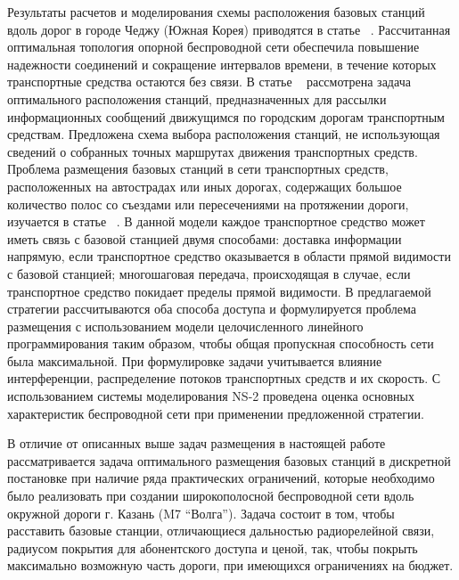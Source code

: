 Результаты расчетов и моделирования схемы расположения базовых станций вдоль дорог в городе Чеджу (Южная Корея) приводятся в статье ~\cite{Lee2}. Рассчитанная оптимальная топология опорной беспроводной сети обеспечила повышение надежности соединений и сокращение интервалов времени, в течение которых транспортные средства остаются без связи. В статье ~\cite{Xie} рассмотрена задача оптимального расположения станций, предназначенных для рассылки информационных сообщений движущимся по городским дорогам транспортным средствам. Предложена схема выбора расположения станций, не использующая сведений о собранных точных маршрутах движения транспортных средств. Проблема размещения базовых станций в сети транспортных средств, расположенных на автострадах или иных дорогах, содержащих большое количество полос со съездами или пересечениями на протяжении дороги, изучается в статье ~\cite{Wu}. В данной модели каждое транспортное средство может иметь связь с базовой станцией двумя способами: доставка информации напрямую, если транспортное средство оказывается в области прямой видимости с базовой станцией; многошаговая передача, происходящая в случае, если транспортное средство покидает пределы прямой видимости. В предлагаемой стратегии рассчитываются оба способа доступа и формулируется проблема размещения с использованием модели целочисленного линейного программирования таким образом, чтобы общая пропускная способность сети была максимальной. При формулировке задачи учитывается влияние интерференции, распределение потоков транспортных средств и их скорость. С использованием системы моделирования NS-2 проведена оценка основных характеристик беспроводной сети при применении предложенной стратегии.

В отличие от описанных выше задач размещения в настоящей работе рассматривается задача оптимального размещения базовых станций в дискретной постановке при наличие ряда практических ограничений, которые необходимо было реализовать при создании широкополосной беспроводной сети вдоль окружной дороги г. Казань (M7  ``Волга'').
Задача состоит в том, чтобы расставить базовые станции, отличающиеся дальностью радиорелейной связи, радиусом покрытия для абонентского доступа и ценой, так, чтобы покрыть максимально возможную часть дороги, при имеющихся ограничениях на бюджет.